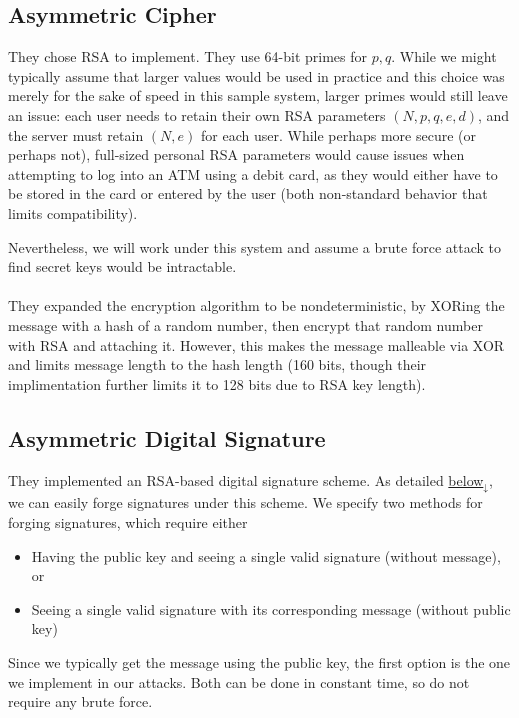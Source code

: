 \documentclass{article}
\begin{document}
\subsection{Asymmetric Cipher}
They chose RSA to implement. They use 64-bit primes for $p,q$.
While we might typically assume that larger values would be used in practice and this choice was merely for
the sake of speed in this sample system, larger primes would still leave an issue:
each user needs to retain their own RSA parameters $(N, p, q, e, d)$, and the server must retain $(N, e)$ for each user.
While perhaps more secure (or perhaps not), full-sized personal RSA parameters would cause issues when attempting
to log into an ATM using a debit card, as they would either have to be stored in the card or entered by the user
(both non-standard behavior that limits compatibility).

Nevertheless, we will work under this system and assume a brute force attack to find secret keys would be intractable. \\
\\
They expanded the encryption algorithm to be nondeterministic, by XORing the message with a hash of a random number,
then encrypt that random number with RSA and attaching it.
However, this makes the message malleable via XOR and limits message length to the hash length
(160 bits, though their implimentation further limits it to 128 bits due to RSA key length).

\subsection{Asymmetric Digital Signature}
They implemented an RSA-based digital signature scheme.
As detailed \hyperref[sec:signaturebad]{below$_\downarrow$},
we can easily forge signatures under this scheme. We specify two methods for forging signatures, which require either
\begin{itemize}
    \item Having the public key and seeing a single valid signature (without message), or
    \item Seeing a single valid signature with its corresponding message (without public key)
\end{itemize}
Since we typically get the message using the public key, the first option is the one we implement in our attacks.
Both can be done in constant time, so do not require any brute force.

\pagebreak[3]
\end{document}
